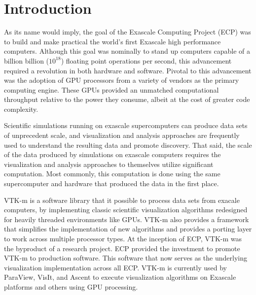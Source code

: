 


\section{Introduction}




As its name would imply, the goal of the Exascale Computing Project (ECP) was to build and make practical the world's first Exascale high performance computers.
Although this goal was nominally to stand up computers capable of a billion billion ($10^{18}$) floating point operations per second, this advancement required a revolution in both hardware and software.
Pivotal to this advancement was the adoption of GPU processors from a variety of vendors as the primary computing engine.
These GPUs provided an unmatched computational throughput relative to the power they consume, albeit at the cost of greater code complexity.

Scientific simulations running on exascale supercomputers can produce data sets of unprecedent
scale, and
visualization and analysis approaches are frequently used to understand the resulting
data and promote discovery.
%
That said, the scale of the data produced by simulations on exascale computers requires
the visualization and analysis approaches to themselves utilize significant computation.
%
Most commonly, this computation is done using the same supercomputer and hardware that produced
the data in the first place.

VTK-m is a software library that it possible to process data sets from exacale computers,
 by implementing classic scientific visualization algorithms redesigned for heavily threaded environments like GPUs.
VTK-m also provides a framework that simplifies the implementation of new algorithms and provides a porting layer to work across multiple processor types.
At the inception of ECP, VTK-m was the byproduct of a research project.
ECP provided the investment to promote VTK-m to production software.
This software that now serves as the underlying visualization implementation across all ECP.
VTK-m is currently used by ParaView, VisIt, and Ascent to execute visualization algorithms on Exascale platforms and others using GPU processing.

